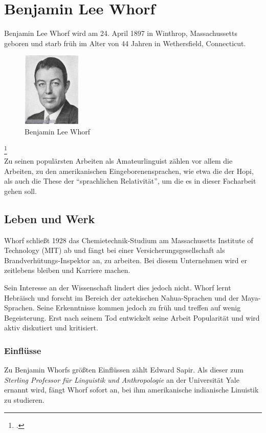 \documentclass[12pt]{scrreprt}
\begin{document}
\chapter{Benjamin Lee Whorf}
\label{chap:bjwhorf}
Benjamin Lee Whorf wird am 24. April 1897 in Winthrop, Massachussetts geboren
und starb früh im Alter von 44 Jahren in Wethersfield, Connecticut.
\begin{figure}[!htb]
	\centering
	\includegraphics[width=0.25\textwidth]{whorf}
	\caption[Benjamin Lee Whorf {\autocite{image:B_L_Whorf}}]{Benjamin Lee Whorf\footnotemark}
	\label{fig:whorf}
\end{figure}
\footcitetext{image:B_L_Whorf}\\
Zu seinen populärsten Arbeiten als Amateurlinguist zählen vor allem die Arbeiten,
zu den amerikanischen Eingeborenensprachen, wie etwa die der Hopi, als auch die
These der \enquote{sprachlichen Relativität}, um die es in dieser Facharbeit
gehen soll.

	\section{Leben und Werk}
	\label{sec:lebenuwerk}
	Whorf schließt 1928 das Chemietechnik-Studium am Massachusetts Institute of
	Technology (MIT) ab und fängt bei einer Versicherungsgesellschaft als
	Brandverhütungs-Inspektor an, zu arbeiten. Bei diesem Unternehmen wird er
	zeitlebens bleiben und Karriere machen.

	Sein Interesse an der Wissenschaft lindert dies jedoch nicht. Whorf lernt
	Hebräisch und forscht im Bereich der aztekischen Nahua-Sprachen und der
	Maya-Sprachen. Seine Erkenntnisse kommen jedoch zu früh und treffen auf wenig
	Begeisterung. Erst nach seinem Tod entwickelt seine Arbeit Popularität und
	wird aktiv diskutiert und kritisiert.
		\subsection{Einflüsse}
		\label{sec:einfluesse}
		Zu Benjamin Whorfs größten Einflüssen zählt Edward Sapir. Als dieser zum
		\textit{Sterling Professor für Linguistik und Anthropologie} an der
		Universität Yale ernannt wird, fängt Whorf sofort an, bei ihm amerikanische
		indianische Linuistik zu studieren.
\end{document}
